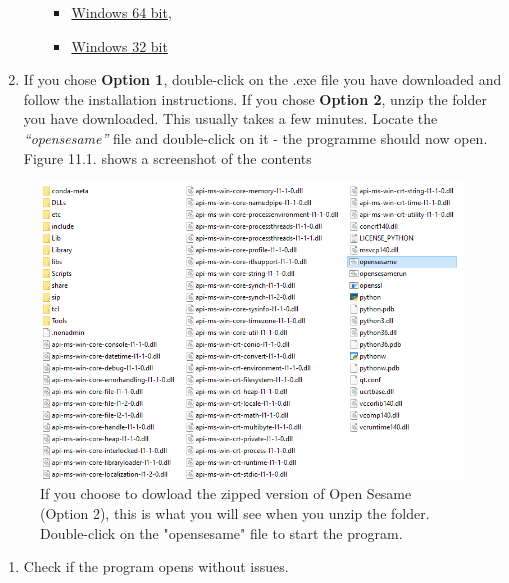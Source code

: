 \documentclass[
]{book}
\providecommand{\tightlist}{%
  \setlength{\itemsep}{0pt}\setlength{\parskip}{0pt}}
\begin{document}
\begin{enumerate}
\begin{itemize}
    \begin{itemize}
    \tightlist
    \item
      \href{https://github.com/smathot/OpenSesame/releases/download/release\%2F3.3.2/opensesame_3.3.2-py37-win64-1.zip}{Windows 64 bit},
    \item
      \href{https://github.com/smathot/OpenSesame/releases/download/release\%2F3.2.8/opensesame_3.2.8-py2.7-win32-1.zip}{Windows 32 bit}
    \end{itemize}
  \end{itemize}
\item
  If you chose \textbf{Option 1}, double-click on the .exe file you have downloaded and follow the installation instructions. If you chose \textbf{Option 2}, unzip the folder you have downloaded. This usually takes a few minutes. Locate the \emph{``opensesame''} file and double-click on it - the programme should now open. Figure 11.1. shows a screenshot of the contents
\end{enumerate}

\begin{figure}

{\centering \includegraphics[width=0.85\linewidth]{images/opensesame/Option2} 

}

\caption{If you choose to dowload the zipped version of Open Sesame (Option 2), this is what you will see when you unzip the folder. Double-click on the "opensesame" file to start the program.}\label{fig:Figure12-1}
\end{figure}

\begin{enumerate}
\def\labelenumi{\arabic{enumi}.}
\setcounter{enumi}{2}
\tightlist
\item
  Check if the program opens without issues.
\end{enumerate}
\end{document}
